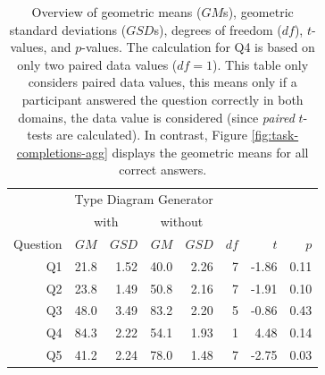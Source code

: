 \documentclass[runningheads]{llncs}
\begin{document}
\begin{itemize}
  \begin{table}[]
    \centering
    \begin{tabular}{rrrrrrrr}
    \toprule
         & \multicolumn{4}{c}{Type Diagram Generator} & & &                                                                   \\
         & \multicolumn{2}{c}{with}                   & \multicolumn{2}{c}{without} &      &       &                     \\
\cmidrule(r){2-3}\cmidrule(r){4-5}
Question & $GM$                                       & $GSD$                       & $GM$ & $GSD$ & $df$ & $t$   & $p$  \\
\midrule
      Q1 & 21.8                                       & 1.52                        & 40.0 & 2.26  & 7    & -1.86 & 0.11 \\
      Q2 & 23.8                                       & 1.49                        & 50.8 & 2.16  & 7    & -1.91 & 0.10 \\
      Q3 & 48.0                                       & 3.49                        & 83.2 & 2.20  & 5    & -0.86 & 0.43 \\
      Q4 & 84.3                                       & 2.22                        & 54.1 & 1.93  & 1    & 4.48  & 0.14 \\
      Q5 & 41.2                                       & 2.24                        & 78.0 & 1.48  & 7    & -2.75 & 0.03 \\
\bottomrule
    \end{tabular}

    \caption{Overview of geometric means ($GM$s), geometric standard deviations ($GSD$s), degrees of freedom ($df$), $t$-values, and $p$-values. The calculation for Q4 is based on only two paired data values ($df = 1$). This table only considers paired data values, this means only if a participant answered the question correctly in both domains, the data value is considered (since \emph{paired} $t$-tests are calculated). In contrast, Figure \ref{fig:task-completions-agg} displays the geometric means for all correct answers.}

    \label{tab:p-values}
  \end{table}


\end{itemize}
\end{document}

